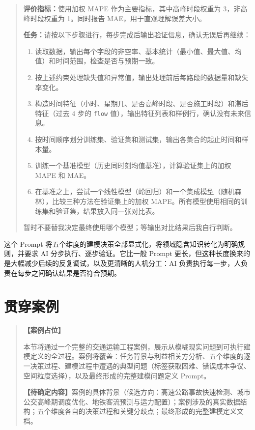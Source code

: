 \begin{quote}
\textbf{评价指标：}使用加权 MAPE 作为主要指标，其中高峰时段权重为 3，非高峰时段权重为 1。同时报告 MAE，用于直观理解误差大小。

\textbf{任务：}请按以下步骤进行，每步完成后输出验证信息，确认无误后再继续：

\begin{enumerate}
  \item 读取数据，输出每个字段的非空率、基本统计（最小值、最大值、均值）和时间范围，检查是否与预期一致。
  \item 按上述约束处理缺失值和异常值，输出处理前后每路段的数据量和缺失率变化。
  \item 构造时间特征（小时、星期几、是否高峰时段、是否施工时段）和滞后特征（过去 4 步的 \texttt{flow} 值），输出特征列表和样例行，确认没有未来信息。
  \item 按时间顺序划分训练集、验证集和测试集，输出各集合的起止时间和样本量。
  \item 训练一个基准模型（历史同时刻均值基准），计算验证集上的加权 MAPE 和 MAE。
  \item 在基准之上，尝试一个线性模型（岭回归）和一个集成模型（随机森林），比较三种方法在验证集上的加权 MAPE。所有模型使用相同的训练集和验证集，结果放入同一张对比表。
\end{enumerate}

暂时不要替我决定最终使用哪个模型；等输出对比结果后我自行判断。
\end{quote}

这个 Prompt 将五个维度的建模决策全部显式化，将领域隐含知识转化为明确规则，并要求 AI 分步执行、逐步验证。它比一般 Prompt 更长，但这种长度换来的是大幅减少后续的反复调试，以及更清晰的人机分工：AI 负责执行每一步，人负责在每步之间确认结果是否符合预期。

\section{贯穿案例}

\begin{quote}
\textbf{【案例占位】}

本节将通过一个完整的交通运输工程案例，展示从模糊现实问题到可执行建模定义的全过程。案例将覆盖：任务背景与利益相关方分析、五个维度的逐一决策过程、建模过程中遭遇的典型问题（标签获取困难、错误成本争议、空间粒度选择），以及最终形成的完整建模问题定义 Prompt。

\textbf{【待确定内容】}案例的具体背景（候选方向：高速公路事故快速检测、城市公交高峰期调度优化、地铁客流预测与运力配置）；案例涉及的真实数据结构；五个维度各自的决策过程和关键分歧点；最终形成的完整建模定义文档。
\end{quote}

